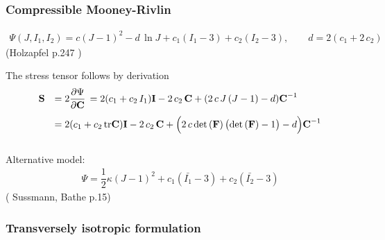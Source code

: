 \subsubsection{Compressible Mooney-Rivlin}

\begin{equation*}
  \begin{array}{lll}
    \Psi(J,I_1,I_2) = c(J-1)^2 - d\,\ln J + c_1(I_1 - 3) + c_2(I_2 - 3), \qquad d = 2(c_1 + 2\,c_2)
  \end{array}
\end{equation*}
(Holzapfel p.247 \cite{holzapfel2000nonlinear})

The stress tensor follows by derivation
\begin{equation*}
  \begin{array}{lll}
    \bfS &= 2\p{\Psi}{\bfC} = 2(c_1 + c_2\,I_1)\bfI - 2\,c_2\,\bfC + (2\,c\,J\,(J-1)-d)\bfC^{-1}\\[4mm]
    &= 2(c_1 + c_2\,\tr{\bfC})\bfI - 2\,c_2\,\bfC + \Big(2\,c\,\det(\bfF)\,\big(\det(\bfF)-1\big)-d\Big)\bfC^{-1}\\[4mm]
  \end{array}
\end{equation*}

Alternative model:
\begin{equation*}
  \begin{array}{lll}
    \Psi = \dfrac12 \kappa (J - 1)^2 + c_1(\bar{I_1} - 3) + c_2(\bar{I_2} - 3)
  \end{array}
\end{equation*}
(\cite{SUSSMAN1987357} Sussmann, Bathe p.15)

\subsubsection{Transversely isotropic formulation}

